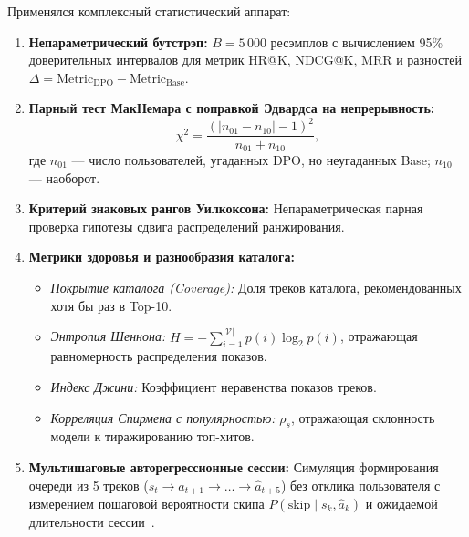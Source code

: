Применялся комплексный статистический аппарат:
\begin{enumerate}
    \item \textbf{Непараметрический бутстрэп:} $B = 5\,000$ ресэмплов с вычислением 95\% доверительных интервалов для метрик HR@K, NDCG@K, MRR и разностей $\Delta = \text{Metric}_{\text{DPO}} - \text{Metric}_{\text{Base}}$.
    \item \textbf{Парный тест МакНемара с поправкой Эдвардса на непрерывность:}
    \begin{equation}
        \chi^2 = \frac{(|n_{01} - n_{10}| - 1)^2}{n_{01} + n_{10}},
        \label{eq:mcnemar}
    \end{equation}
    где $n_{01}$ — число пользователей, угаданных DPO, но неугаданных Base; $n_{10}$ — наоборот.
    \item \textbf{Критерий знаковых рангов Уилкоксона:} Непараметрическая парная проверка гипотезы сдвига распределений ранжирования.
    \item \textbf{Метрики здоровья и разнообразия каталога:}
    \begin{itemize}
        \item \textit{Покрытие каталога (Coverage):} Доля треков каталога, рекомендованных хотя бы раз в Top-10.
        \item \textit{Энтропия Шеннона:} $H = - \sum_{i=1}^{|\mathcal{V}|} p(i) \log_2 p(i)$, отражающая равномерность распределения показов.
        \item \textit{Индекс Джини:} Коэффициент неравенства показов треков.
        \item \textit{Корреляция Спирмена с популярностью:} $\rho_s$, отражающая склонность модели к тиражированию топ-хитов.
    \end{itemize}
    \item \textbf{Мультишаговые авторегрессионные сессии:} Симуляция формирования очереди из 5 треков ($s_t \to \hat{a}_{t+1} \to \dots \to \hat{a}_{t+5}$) без отклика пользователя с измерением пошаговой вероятности скипа $P(\text{skip} \mid s_k, \hat{a}_k)$ и ожидаемой длительности сессии~\cite{volkov2026session}.
\end{enumerate}
